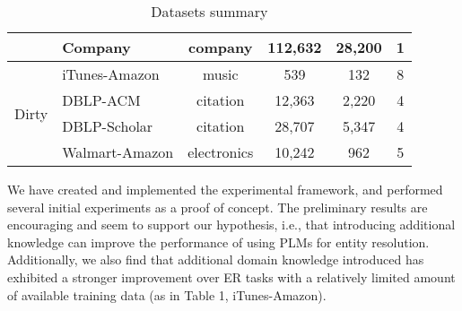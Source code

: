 \begin{table}[h]
{\begin{tabular}{|c|l|c|c|c|c|}
                            & Company                                & company          & 112,632       & 28,200               & 1                      \\ \hline
\multirow{4}{*}{Dirty}      & iTunes-Amazon                          & music            & 539           & 132                  & 8                      \\ \cline{2-6} 
                            & DBLP-ACM                               & citation         & 12,363        & 2,220                & 4                      \\ \cline{2-6} 
                            & DBLP-Scholar                           & citation         & 28,707        & 5,347                & 4                      \\ \cline{2-6} 
                            & Walmart-Amazon                         & electronics      & 10,242        & 962                  & 5                      \\ \hline
\end{tabular}%
}
\caption{Datasets summary}
\label{tab:exp-data}
\end{table}
We have created and implemented the experimental framework, and performed several initial experiments as a proof of concept. The preliminary results are encouraging and seem to support our hypothesis, i.e.,  that introducing additional knowledge can improve the performance of using PLMs for entity resolution. Additionally, we also find that additional domain knowledge introduced has exhibited a stronger improvement over ER tasks with a relatively limited amount of available training data (as in Table 1, iTunes-Amazon).
	

